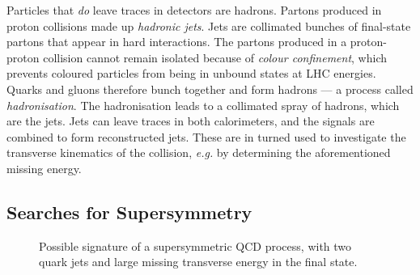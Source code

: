 \documentclass[twoside,english]{uiofysmaster}
\begin{document}
{Particles that \textit{do} leave traces in detectors are hadrons. Partons produced in proton collisions made up \textit{hadronic jets}. Jets are collimated bunches of final-state partons that appear in hard interactions. The partons produced in a proton-proton collision cannot remain isolated because of \textit{colour confinement}, which prevents coloured particles from being in unbound states at LHC energies. Quarks and gluons therefore bunch together and form hadrons --- a process called \textit{hadronisation}. The hadronisation leads to a collimated spray of hadrons, which are the jets. Jets can leave traces in both calorimeters, and the signals are combined to form reconstructed jets. These are in turned used to investigate the transverse kinematics of the collision, \textit{e.g.} by determining the aforementioned missing energy. 





\subsection{Searches for Supersymmetry}

\begin{figure}[H]
\centering
{}
\caption{Possible signature of a supersymmetric QCD process, with two quark jets and large missing transverse energy in the final state.}
\label{Fig:: susy hadron : decay at ATLAS}
\end{figure}


}
\end{document}
